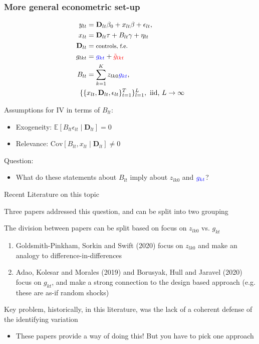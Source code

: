 \documentclass[notes,11pt, aspectratio=169]{beamer}
\newenvironment{wideitemize}{\itemize\addtolength{\itemsep}{10pt}}{\enditemize}
\begin{document}
\begin{frame}
\frametitle{More general econometric set-up}
\begin{align}
y_{lt} & =\mathbf{D}_{lt}\beta_0 +x_{lt}\beta+\epsilon_{lt}, \notag \\
x_{lt} & =\mathbf{D}_{lt}\tau+ B_{lt}\gamma+\eta_{lt}\notag \\
\mathbf{D}_{lt} &= \text{\footnotesize{controls, f.e.}} \notag \\
g_{lkt} &=   \textcolor{blue}{g_{ kt}} + \textcolor{red}{\tilde{g}_{lkt}}  \notag \\
B_{lt} &= \sum_{k=1}^K z_{lk0} \textcolor{blue}{g_{kt}}, \notag \\
\{\{  &  x_{lt},\mathbf{D}_{lt},\epsilon_{lt} \}_{t=1}^T\}_{l=1}^L, \text{ iid, } L\rightarrow \infty \notag
\end{align}



  Assumptions for IV in terms of $B_{lt}$:
  \begin{itemize}
	\setlength\itemsep{1em}
  \item Exogeneity: $\mathbb{E}\left[B_{lt}\epsilon_{lt}\middle| \mathbf{D}_{lt}\right] = 0$
  \item Relevance: $\text{Cov}\left[B_{lt}, x_{lt} \middle| \mathbf{D}_{lt}\right] \not= 0$
  \end{itemize}
  
    Question:
  \begin{itemize}
  \item What do these statements about $B_{lt}$ imply about $z_{lk0}$ and $\textcolor{blue}{g_{kt}}$?
  \end{itemize}

\end{frame}

\begin{frame}{Recent Literature on this topic}
  \begin{wideitemize}
  \item Three papers addressed this question, and can be split into two grouping
  \item The division between papers can be split based on focus on $z_{lk0}$ vs. $g_{kt}$
    \begin{enumerate}
    \item Goldsmith-Pinkham, Sorkin and Swift (2020) focus on $z_{lk0}$ and make an analogy to difference-in-differences
    \item Adao, Kolesar and Morales (2019) and Borusyak, Hull and Jaravel (2020) focus on $g_{kt}$, and make a strong connection to the design based approach (e.g. these are as-if random shocks)
    \end{enumerate}
  \item Key problem, historically, in this literature, was the lack
    of a coherent defense of the identifying variation
    \begin{itemize}
      \item These papers provide a way of doing this! But you have to pick one approach
    \end{itemize}
  \end{wideitemize}
\end{frame}
\end{document}
